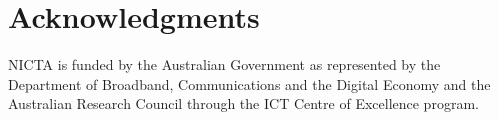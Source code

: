\documentclass[10pt,a5paper,twoside]{article}
\begin{document}
\section*{Acknowledgments} 

NICTA is funded by the Australian
Government as represented by the Department of Broadband,
Communications and the Digital Economy and the Australian Research
Council through the ICT Centre of Excellence program.

%


%
%



%

\end{document}
